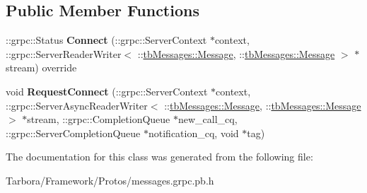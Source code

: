 \subsection*{Public Member Functions}
\begin{DoxyCompactItemize}
\item 
\mbox{\label{classtbMessages_1_1TarboraMessages_1_1WithAsyncMethod__Connect_a81f59526562d430a1c185bd50635f468}} 
\+::grpc\+::\+Status {\bfseries Connect} (\+::grpc\+::\+Server\+Context $\ast$context, \+::grpc\+::\+Server\+Reader\+Writer$<$ \+::\hyperlink{classtbMessages_1_1Message}{tb\+Messages\+::\+Message}, \+::\hyperlink{classtbMessages_1_1Message}{tb\+Messages\+::\+Message} $>$ $\ast$stream) override
\item 
\mbox{\label{classtbMessages_1_1TarboraMessages_1_1WithAsyncMethod__Connect_a68f01a2d34ed7d3c5f7bc0c8d5b4a6a2}} 
void {\bfseries Request\+Connect} (\+::grpc\+::\+Server\+Context $\ast$context, \+::grpc\+::\+Server\+Async\+Reader\+Writer$<$ \+::\hyperlink{classtbMessages_1_1Message}{tb\+Messages\+::\+Message}, \+::\hyperlink{classtbMessages_1_1Message}{tb\+Messages\+::\+Message} $>$ $\ast$stream, \+::grpc\+::\+Completion\+Queue $\ast$new\+\_\+call\+\_\+cq, \+::grpc\+::\+Server\+Completion\+Queue $\ast$notification\+\_\+cq, void $\ast$tag)
\end{DoxyCompactItemize}


The documentation for this class was generated from the following file\+:\begin{DoxyCompactItemize}
\item 
Tarbora/\+Framework/\+Protos/messages.\+grpc.\+pb.\+h\end{DoxyCompactItemize}
